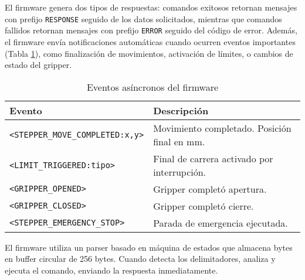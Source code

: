 El firmware genera dos tipos de respuestas: comandos exitosos retornan mensajes con prefijo \texttt{RESPONSE} seguido de los datos solicitados, mientras que comandos fallidos retornan mensajes con prefijo \texttt{ERROR} seguido del código de error. Además, el firmware envía notificaciones automáticas cuando ocurren eventos importantes (Tabla \ref{tab:eventos_asincronos}), como finalización de movimientos, activación de límites, o cambios de estado del gripper.

\begin{table}[H]
\centering
\begin{tabular}{|l|p{8cm}|}
\hline
\textbf{Evento} & \textbf{Descripción} \\
\hline
\texttt{<STEPPER\_MOVE\_COMPLETED:x,y>} & Movimiento completado. Posición final en mm. \\
\hline
\texttt{<LIMIT\_TRIGGERED:tipo>} & Final de carrera activado por interrupción. \\
\hline
\texttt{<GRIPPER\_OPENED>} & Gripper completó apertura. \\
\hline
\texttt{<GRIPPER\_CLOSED>} & Gripper completó cierre. \\
\hline
\texttt{<STEPPER\_EMERGENCY\_STOP>} & Parada de emergencia ejecutada. \\
\hline
\end{tabular}
\caption{Eventos asíncronos del firmware}
\label{tab:eventos_asincronos}
\end{table}

El firmware utiliza un parser basado en máquina de estados que almacena bytes en buffer circular de 256 bytes. Cuando detecta los delimitadores, analiza y ejecuta el comando, enviando la respuesta inmediatamente.
